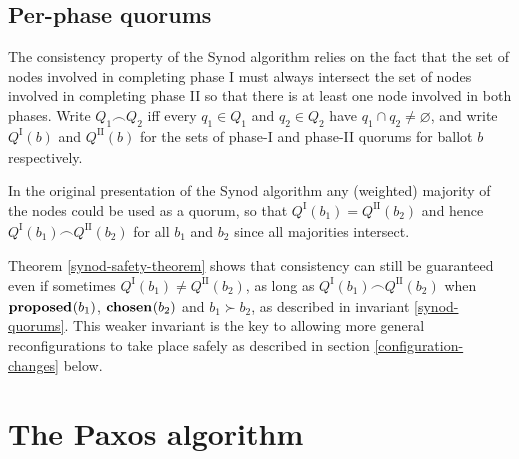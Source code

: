 \documentclass[journal]{IEEEtran}
\begin{document}
\subsection{Per-phase quorums}\label{per-phase-quorums}

\def\I#1#2{{#1}^\textrm{I}_{#2}}
\def\II#1#2{{#1}^\textrm{II}_{#2}}
\def\QI#1{\I{Q}{#1}}
\def\QII#1{\II{Q}{#1}}

The consistency property of the Synod algorithm relies on the fact that the set
of nodes involved in completing phase I must always intersect the set of nodes
involved in completing phase II so that there is at least one node involved in
both phases.  Write $Q_1 \frown Q_2$ iff every $q_1 \in Q_1$ and $q_2 \in Q_2$
have ${q_1 \cap q_2 \ne \varnothing}$, and write $\QI{}(b)$ and $\QII{}(b)$ for
the sets of phase-I and phase-II quorums for ballot $b$ respectively.

In the original presentation of the Synod algorithm any (weighted) majority of
the nodes could be used as a quorum, so that $\QI{}(b_1) = \QII{}(b_2)$ and
hence $\QI{}(b_1) \frown \QII{}(b_2)$ for all $b_1$ and $b_2$ since all
majorities intersect.

Theorem \ref{synod-safety-theorem} shows that consistency can still be
guaranteed even if sometimes $\QI{}(b_1) \ne \QII{}(b_2)$, as long as
$\QI{}(b_1) \frown \QII{}(b_2)$ when $\mathbf{proposed}_{}(b_1)$, $\mathbf{chosen}_{}(b_2)$ and $b_1
\succ b_2$, as described in invariant \ref{synod-quorums}.  This weaker
invariant is the key to allowing more general reconfigurations to take place
safely as described in section \ref{configuration-changes} below.

\section{The Paxos algorithm}\label{paxos-text}

\def\promiseEraOk{$e(b) \le e(\mathrm{min}(i, i_\mathrm{max}))$ }
\end{document}
